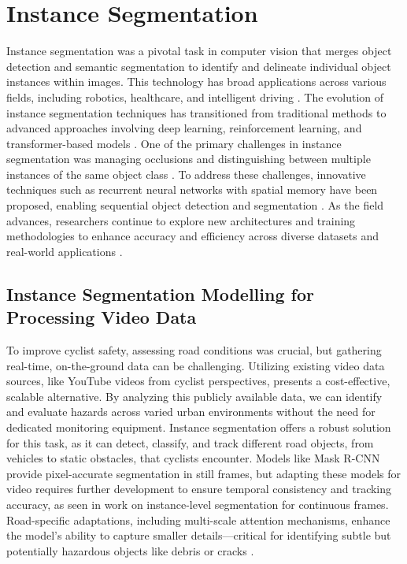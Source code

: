\section{Instance Segmentation}
Instance segmentation was a pivotal task in computer vision that merges object detection and semantic segmentation to identify and delineate individual object instances within images. This technology has broad applications across various fields, including robotics, healthcare, and intelligent driving \citet{Sharma2022}. The evolution of instance segmentation techniques has transitioned from traditional methods to advanced approaches involving deep learning, reinforcement learning, and transformer-based models \citet{Sharma2022}. One of the primary challenges in instance segmentation was managing occlusions and distinguishing between multiple instances of the same object class \citet{Hafiz2020}. To address these challenges, innovative techniques such as recurrent neural networks with spatial memory have been proposed, enabling sequential object detection and segmentation \citet{RomeraParedes2015}. As the field advances, researchers continue to explore new architectures and training methodologies to enhance accuracy and efficiency across diverse datasets and real-world applications \citet{Tian2021, Hafiz2020}.



\subsection{Instance Segmentation Modelling for Processing Video Data}

To improve cyclist safety, assessing road conditions was crucial, but gathering real-time, on-the-ground data can be challenging. Utilizing existing video data sources, like YouTube videos from cyclist perspectives, presents a cost-effective, scalable alternative. By analyzing this publicly available data, we can identify and evaluate hazards across varied urban environments without the need for dedicated monitoring equipment. Instance segmentation offers a robust solution for this task, as it can detect, classify, and track different road objects, from vehicles to static obstacles, that cyclists encounter. Models like Mask R-CNN \citep{He:2017} provide pixel-accurate segmentation in still frames, but adapting these models for video requires further development to ensure temporal consistency and tracking accuracy, as seen in \citet{ZhangY:2016} work on instance-level segmentation for continuous frames. Road-specific adaptations, including multi-scale attention mechanisms, enhance the model's ability to capture smaller details—critical for identifying subtle but potentially hazardous objects like debris or cracks \citep{PlosOne:2022}.

